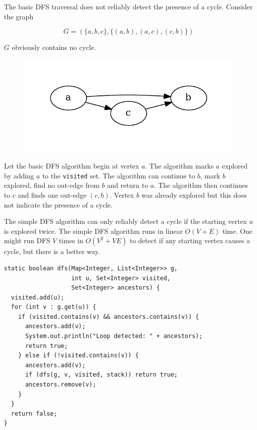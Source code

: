 \documentclass{book}
\begin{document}
The basic DFS traversal does not reliably detect the presence of a cycle. Consider the graph

\begin{equation*}
G = ( \{a,b,c\}, \{ (a,b), (a,c), (c,b) \} )
\end{equation*}

$G$ obviously contains no cycle.

\begin{figure}[H]
\centering
\includegraphics{figures/abc_dag}
\label{abc_dag}
\end{figure}

Let the basic DFS algorithm begin at vertex $a$. The algorithm marks $a$ explored by adding $a$ to the \texttt{visited} set. The algorithm can continue to $b$, mark $b$ explored, find no out-edge from $b$ and return to $a$. The algorithm then continues to $c$ and finds one out-edge $(c,b)$. Vertex $b$ was already explored but this does not indicate the presence of a cycle.

The simple DFS algorithm can only reliably detect a cycle if the starting vertex $u$ is explored twice. The simple DFS algorithm runs in linear $O(V+E)$ time. One might run DFS $V$ times in $O(V^2+VE)$ to detect if any starting vertex causes a cycle, but there is a better way.

\begin{lstlisting}[columns=fixed,caption={A modified two-color DFS algorithm},label={2colormod}]
static boolean dfs(Map<Integer, List<Integer>> g,
                   int u, Set<Integer> visited,
                   Set<Integer> ancestors) {
  visited.add(u);
  for (int v : g.get(u)) {
    if (visited.contains(v) && ancestors.contains(v)) {
      ancestors.add(v);
      System.out.println("Loop detected: " + ancestors);
      return true;
    } else if (!visited.contains(v)) {
      ancestors.add(v);
      if (dfs(g, v, visited, stack)) return true;
      ancestors.remove(v);
    }
  }
  return false;
}
\end{lstlisting}
\end{document}
